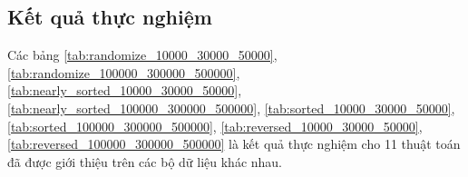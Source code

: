 \subsection{Kết quả thực nghiệm} \label{subsec:experimental_result}
Các bảng \ref{tab:randomize_10000_30000_50000}, \ref{tab:randomize_100000_300000_500000}, \ref{tab:nearly_sorted_10000_30000_50000}, \ref{tab:nearly_sorted_100000_300000_500000}, \ref{tab:sorted_10000_30000_50000}, \ref{tab:sorted_100000_300000_500000}, \ref{tab:reversed_10000_30000_50000}, \ref{tab:reversed_100000_300000_500000} là kết quả thực nghiệm cho 11 thuật toán đã được giới thiệu trên các bộ dữ liệu khác nhau.

